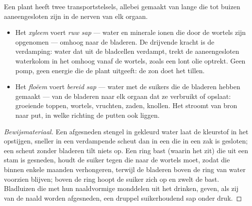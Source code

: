 \begin{proposition}\label{prop:g12:plant-rooted-life:saps}
Een plant heeft twee transportstelsels, allebei gemaakt van lange 
die tot buizen aaneengesloten zijn in de nerven van elk orgaan.
\begin{itemize}
  \item Het \emph{xyleem} voert \emph{ruw sap} --- water en
        minerale ionen die door de wortels zijn opgenomen --- omhoog naar
        de bladeren. De drijvende kracht is de verdamping: water dat uit
        de bladcellen verdampt, trekt de aaneengesloten waterkolom in het
         omhoog vanaf de wortels, zoals een lont olie optrekt. Geen
        pomp, geen energie die de plant uitgeeft: de zon doet het tillen.
  \item Het \emph{floëem} voert \emph{bereid sap} --- water
        met de suikers die de bladeren hebben gemaakt --- van de bladeren
        naar elk orgaan dat ze verbruikt of opslaat: groeiende toppen,
        wortels, vruchten, zaden, knollen. Het stroomt van bron naar put,
        in welke richting de putten ook liggen.
\end{itemize}
\end{proposition}
\begin{proof}[Bewijsmateriaal]
Een afgesneden stengel in gekleurd water laat de kleurstof in het 
opstijgen, sneller in een verdampende scheut dan in een die in een zak is
gesloten; een scheut zonder bladeren tilt niets op. Een ring bast (waarin
het  zit) die uit een stam is gesneden, houdt de suiker tegen die
naar de wortels moet, zodat die binnen enkele maanden verhongeren, terwijl
de bladeren boven de ring van water voorzien blijven; boven de ring hoopt
de suiker zich op en zwelt de bast. Bladluizen die met hun naaldvormige
monddelen uit het  drinken, geven, als zij van de naald worden
afgesneden, een druppel suikerhoudend sap onder druk.
\end{proof}

